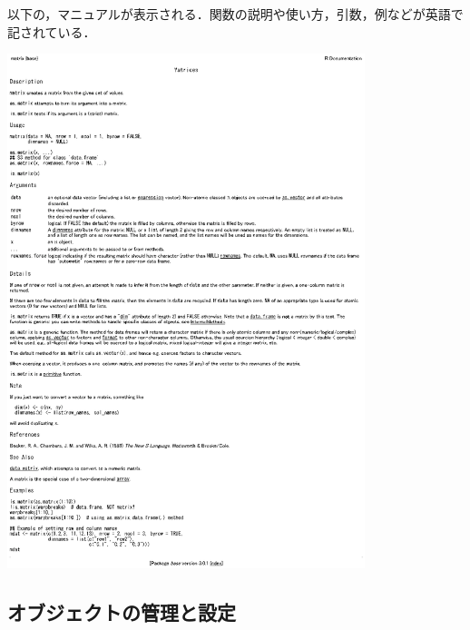 \documentclass[a4paper,10pt,fleqn]{jarticle}
\begin{document}
以下の，マニュアルが表示される．関数の説明や使い方，引数，例などが英語で記されている．
\begin{center}
\includegraphics[height=15cm]{img/matrices.eps}
\end{center}

\subsection{オブジェクトの管理と設定}
\end{document}
